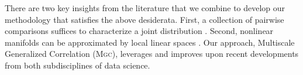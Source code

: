 \documentclass[11pt]{article}
\providecommand{\sct}[1]{{\normalfont\textsc{#1}}}
\newcommand{\Mgc}{\sct{Mgc}}
\begin{document}



There are two key insights from the literature that we combine to develop our methodology that satisfies the above desiderata.  First, a collection of pairwise comparisons suffices to characterize a joint distribution \cite{Maa1996}.  Second, nonlinear manifolds can be approximated by local linear spaces \cite{Allard2012}.  Our approach, Multiscale Generalized Correlation (\Mgc), leverages and improves upon recent developments from both subdisciplines of data science.
\end{document}
